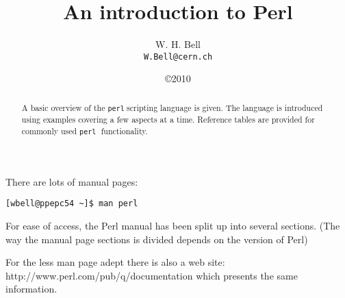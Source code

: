 \documentclass[17pt,dvips]{foils}
\title{An introduction to Perl}
\author{W. H. Bell\\
       \texttt{W.Bell@cern.ch}
       }
\date{\copyright 2010}
\def\perl{\texttt{perl}$\;$}
\begin{document}
\maketitle
\begin{abstract}
\begin{center}
A basic overview of the \perl scripting language is given.  The
language is introduced using examples covering a few aspects at a
time.  Reference tables are provided for commonly used \perl
functionality.
\end{center}
\end{abstract}


\noindent There are lots of manual pages:
\begin{verbatim}
[wbell@ppepc54 ~]$ man perl
\end{verbatim}
For ease of access, the Perl manual has been split up into
several sections.  (The way the manual page sections is divided
depends on the version of Perl)

\noindent For the less man page adept there is also a web site:
http://www.perl.com/pub/q/documentation which presents the same
information.


\end{document}
